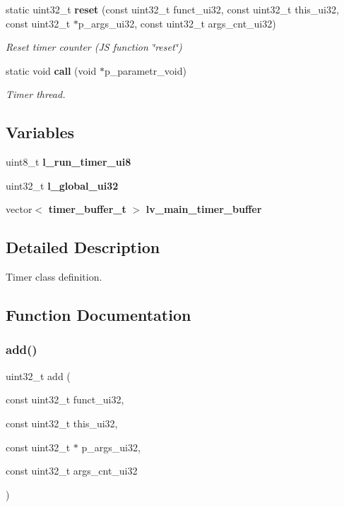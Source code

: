 \begin{DoxyCompactItemize}
static uint32\+\_\+t \textbf{ reset} (const uint32\+\_\+t funct\+\_\+ui32, const uint32\+\_\+t this\+\_\+ui32, const uint32\+\_\+t $\ast$p\+\_\+args\+\_\+ui32, const uint32\+\_\+t args\+\_\+cnt\+\_\+ui32)
\begin{DoxyCompactList}\small\item\em Reset timer counter (JS function \char`\"{}reset\char`\"{}) \end{DoxyCompactList}\item 
static void \textbf{ call} (void $\ast$p\+\_\+parametr\+\_\+void)
\begin{DoxyCompactList}\small\item\em Timer thread. \end{DoxyCompactList}\end{DoxyCompactItemize}
\subsection*{Variables}
\begin{DoxyCompactItemize}
\item 
uint8\+\_\+t \textbf{ l\+\_\+run\+\_\+timer\+\_\+ui8}
\item 
\mbox{\label{group___timer_gaaf24f52eacb5becb96873fc78fe380c8}} 
uint32\+\_\+t {\bfseries l\+\_\+global\+\_\+ui32}
\item 
\mbox{\label{group___timer_ga0e8baa380b2340a5859e05e24b95fc21}} 
vector$<$ \textbf{ timer\+\_\+buffer\+\_\+t} $>$ {\bfseries lv\+\_\+main\+\_\+timer\+\_\+buffer}
\end{DoxyCompactItemize}


\subsection{Detailed Description}
Timer class definition. 



\subsection{Function Documentation}
\mbox{\label{group___timer_ga490542606fe12f142cd2b00cb1ecaefd}} 
\subsubsection{add()}
{\footnotesize\ttfamily uint32\+\_\+t add (\begin{DoxyParamCaption}\item[{const uint32\+\_\+t}]{funct\+\_\+ui32,  }\item[{const uint32\+\_\+t}]{this\+\_\+ui32,  }\item[{const uint32\+\_\+t $\ast$}]{p\+\_\+args\+\_\+ui32,  }\item[{const uint32\+\_\+t}]{args\+\_\+cnt\+\_\+ui32 }\end{DoxyParamCaption})\hspace{0.3cm}{\ttfamily [static]}}



